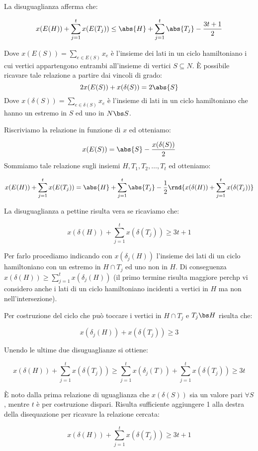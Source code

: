 \documentclass[\main/main.tex]{subfiles}
\begin{document}
La disuguaglianza afferma che:

\[
    x(E(H)) + \sum_{j=1}^t x(E(T_j)) \leq \abs{H} + \sum_{j=1}^t \abs{T_j} - \frac{3t+1}{2}
\]

Dove \(x(E(S)) = \sum_{e \in E(S)} x_e\) è l'insieme dei lati in un ciclo hamiltoniano i cui vertici appartengono entrambi all'insieme di vertici \(S\subseteq N\). È possibile ricavare tale relazione a partire dai vincoli di grado:
\[
    2x(E(S)) + x(\delta(S)) = 2\abs{S}
\]
Dove \(x(\delta(S)) = \sum_{e \in \delta(S)} x_e\) è l'insieme di lati in un ciclo hamiltoniano che hanno un estremo in \(S\) ed uno in \(N\bs S\).

Riscriviamo la relazione in funzione di \(x\) ed otteniamo:

\[
    x(E(S)) = \abs{S} - \frac{x(\delta(S))}{2}
\]
Sommiamo tale relazione sugli insiemi \(H, T_1, T_2, \ldots, T_t\) ed otteniamo:

\[
    x(E(H)) + \sum_{j=1}^t x(E(T_j)) = \abs{H} + \sum_{j=1}^t \abs{T_j} - \frac{1}{2}\rnd{x(\delta(H))+\sum_{j=1}^t x(\delta(T_j))}
\]

La disuguaglianza a pettine risulta vera se ricaviamo che:

\[
    x(\delta(H)) + \sum_{j=1}^t x(\delta(T_j)) \geq 3t+1
\]

Per farlo procediamo indicando con \(x(\delta_j(H))\) l'insieme dei lati di un ciclo hamiltoniano con un estremo in \(H \cap T_j\) ed uno non in \(H\). Di conseguenza \(x(\delta(H)) \geq \sum_{j=1}^t x(\delta_j(H))\) (il primo termine risulta maggiore perchp vi considero anche i lati di un ciclo hamiltoniano incidenti a vertici in \(H\) ma non nell'intersezione).

Per costruzione del ciclo che può toccare i vertici in \(H\cap T_j\) e \(T_j\bs H\) risulta che:

\[
    x(\delta_j(H)) + x(\delta(T_j)) \geq 3
\]

Unendo le ultime due disuguaglianze si ottiene:

\[
    x(\delta(H)) + \sum_{j=1}^t x(\delta(T_j)) \geq \sum_{j=1}^t x(\delta_j(T)) + \sum_{j=1}^t x(\delta(T_j)) \geq 3t
\]

È noto dalla prima relazione di uguaglianza che \(x(\delta(S))\) sia un valore pari \(\forall S\), mentre \(t\) è per costruzione dispari. Risulta sufficiente aggiungere 1 alla destra della disequazione per ricavare la relazione cercata:

\[
    x(\delta(H)) + \sum_{j=1}^t x(\delta(T_j)) \geq 3t + 1
\]
\end{document}

